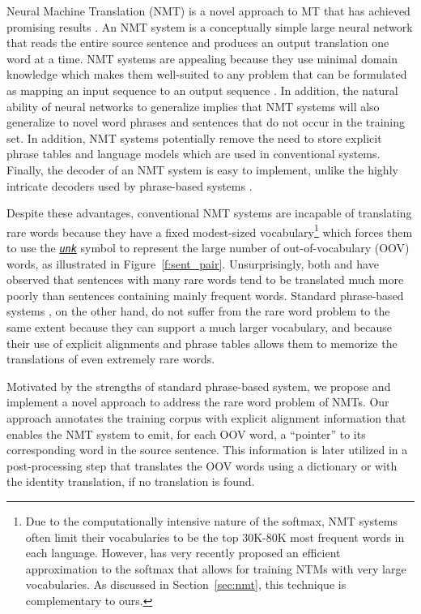 \documentclass[11pt]{article}
\newcommand{\edit}[1]{{#1}} \newcommand{\hide}[1]{}
\newcommand{\unksym}{{\it \texttt{\underline{unk}}}}
\begin{document}
Neural Machine
Translation (NMT) is a novel approach to MT that has 
achieved promising results \cite{kal13,sutskever14,cho14,bog15,jean15}. 
An NMT system is a conceptually simple large neural network that 
reads the entire source sentence and produces an output translation one word at a time.
NMT systems are appealing because they use minimal domain knowledge which
makes them well-suited to any problem that can be formulated as mapping an input sequence 
to an output sequence \cite{sutskever14}.
In addition, the natural ability of neural networks to generalize implies that 
NMT systems will also generalize to novel word phrases and sentences that do not occur in the
training set. 
In addition, NMT systems potentially remove the need to store explicit phrase tables 
and language models which are used in conventional systems. 
Finally, the decoder of an NMT system is easy to implement, unlike the highly
intricate decoders used by phrase-based systems \cite{Koehn:2003:SMT}.

Despite these advantages, conventional NMT systems are incapable of translating rare 
words because they have a fixed modest-sized vocabulary\footnote{ Due to the computationally intensive nature of the softmax, NMT systems often limit 
their vocabularies to be the top 30K-80K most frequent words in each language. However, 
has very recently proposed an efficient approximation to the softmax that \edit{allows
for training NTMs with very large vocabularies. As discussed in Section~\ref{sec:nmt}, this technique is complementary to ours.}}
which forces them to use the \unksym{} symbol to 
represent the large number of out-of-vocabulary (OOV) words, as illustrated in Figure~\ref{f:sent_pair}.
Unsurprisingly, both  and  have
observed that sentences with many rare words tend to be translated much more poorly than sentences
containing mainly frequent words.
Standard phrase-based systems \cite{koehn2007moses,chiang07hiero,cer10phrasal,dyer10cdec}, 
on the other hand, do not suffer from the rare word 
problem to the same extent because they can support a much larger vocabulary, 
and because their use of explicit alignments
and phrase tables allows them to memorize the translations 
of even extremely rare words. 

Motivated by the strengths of standard phrase-based system, we
propose and implement a novel approach to address the rare word problem of NMTs.
Our approach annotates the training corpus with 
explicit alignment information that enables the NMT system to emit, for each OOV word, a
``pointer'' to its corresponding word in the source sentence. This
information is later utilized in a post-processing step that translates
the OOV words using a dictionary or with the identity translation, if no translation is found.
\end{document}
